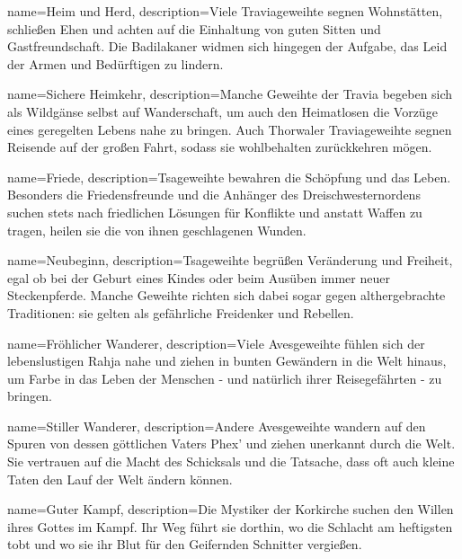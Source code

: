 {
    name={Heim und Herd},
    description={Viele Traviageweihte segnen Wohnstätten, schließen Ehen und achten auf die Einhaltung von guten Sitten und Gastfreundschaft. Die Badilakaner widmen sich hingegen der Aufgabe, das Leid der Armen und Bedürftigen zu lindern.}
}


{
    name={Sichere Heimkehr},
    description={Manche Geweihte der Travia begeben sich als Wildgänse selbst auf Wanderschaft, um auch den Heimatlosen die Vorzüge eines geregelten Lebens nahe zu bringen. Auch Thorwaler Traviageweihte segnen Reisende auf der großen Fahrt, sodass sie wohlbehalten zurückkehren mögen. }
}


{
    name={Friede},
    description={Tsageweihte bewahren die Schöpfung und das Leben. Besonders die Friedensfreunde und die Anhänger des Dreischwesternordens suchen stets nach friedlichen Lösungen für Konflikte und anstatt Waffen zu tragen, heilen sie die von ihnen geschlagenen Wunden. }
}


{
    name={Neubeginn},
    description={Tsageweihte begrüßen Veränderung und Freiheit, egal ob bei der Geburt eines Kindes oder beim Ausüben immer neuer Steckenpferde. Manche Geweihte richten sich dabei sogar gegen althergebrachte Traditionen: sie gelten als gefährliche Freidenker und Rebellen. }
}


{
    name={Fröhlicher Wanderer},
    description={Viele Avesgeweihte fühlen sich der lebenslustigen Rahja nahe und ziehen in bunten Gewändern in die Welt hinaus, um Farbe in das Leben der Menschen - und natürlich ihrer Reisegefährten - zu bringen. }
}


{
    name={Stiller Wanderer},
    description={Andere Avesgeweihte wandern auf den Spuren von dessen göttlichen Vaters Phex' und ziehen unerkannt durch die Welt. Sie vertrauen auf die Macht des Schicksals und die Tatsache, dass oft auch kleine Taten den Lauf der Welt ändern können.}
}


{
    name={Guter Kampf},
    description={Die Mystiker der Korkirche suchen den Willen ihres Gottes im Kampf. Ihr Weg führt sie dorthin, wo die Schlacht am heftigsten tobt und wo sie ihr Blut für den Geifernden Schnitter vergießen.}
}


